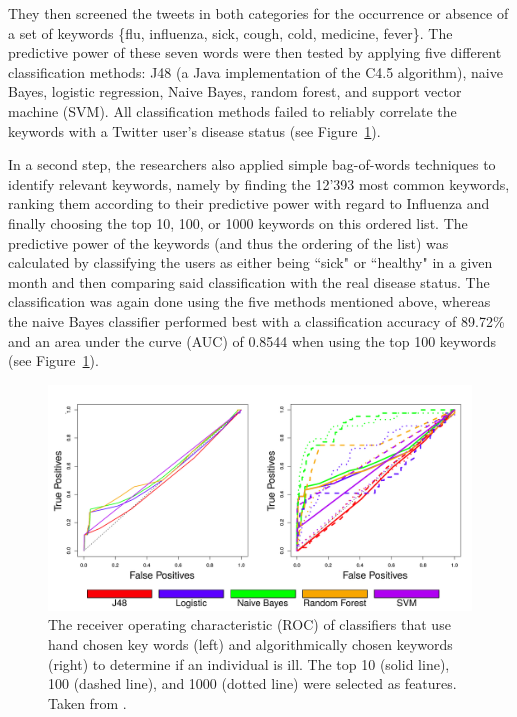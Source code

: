 \documentclass[11pt, a4paper,twoside]{report}\usepackage[]{graphicx}\usepackage[]{color}
\begin{document}
They then screened the tweets in both categories for the occurrence or absence of a set of keywords \{flu, influenza, sick, cough, cold, medicine, fever\}. The predictive power of these seven words were then tested by applying five different classification methods: J48 (a Java implementation of the C4.5 algorithm), naive Bayes, logistic regression, Naive Bayes, random forest, and support vector machine (SVM). All classification methods failed to reliably correlate the keywords with a Twitter user's disease status (see Figure~\ref{fig:ROC_classification_seed}).

In a second step, the researchers also applied simple bag-of-words techniques to identify relevant keywords, namely by finding the 12'393 most common keywords, ranking them according to their predictive power with regard to Influenza and finally choosing the top 10, 100, or 1000 keywords on this ordered list. The predictive power of the keywords (and thus the ordering of the list) was calculated by classifying the users as either being ``sick" or ``healthy" in a given month and then comparing said classification with the real disease status. The classification was again done using the five methods mentioned above, whereas the naive Bayes classifier performed best with a classification accuracy of 89.72\% and an area under the curve (AUC) of 0.8544 when using the top 100 keywords (see Figure~\ref{fig:ROC_classification_seed}).

\begin{figure}[htbp!]
  \centering
    \includegraphics[width=.9\textwidth]{01_ROC_classification_seed.png}
  \caption{The receiver operating characteristic (ROC) of classifiers that use hand chosen key words (left) and algorithmically chosen keywords (right) to determine if an individual is ill. The top 10 (solid line), 100 (dashed line), and 1000 (dotted line) were selected as features. Taken from \cite{bodnar_ground_2014}.}
  \label{fig:ROC_classification_seed}
  \end{figure}
\end{document}
